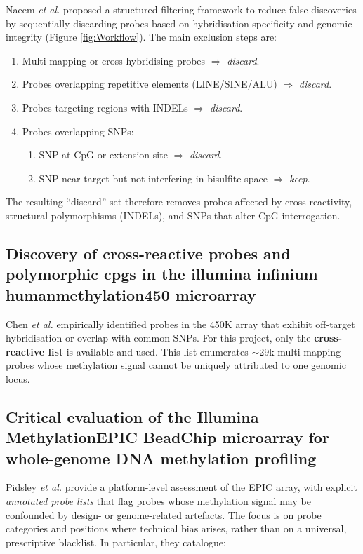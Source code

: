 \documentclass[10pt]{extarticle}
\begin{document}
Naeem \emph{et al.} \cite{naeem2014} proposed a structured filtering framework to reduce false discoveries by sequentially discarding probes based on hybridisation specificity and genomic integrity (Figure \ref{fig:Workflow}).  
The main exclusion steps are:
\begin{enumerate}[label=-]
  \item Multi-mapping or cross-hybridising probes $\Rightarrow$ \textit{discard}.
  \item Probes overlapping repetitive elements (LINE/SINE/ALU) $\Rightarrow$ \textit{discard}.
  \item Probes targeting regions with INDELs $\Rightarrow$ \textit{discard}.
  \item Probes overlapping SNPs:
    \begin{enumerate}[label=--]
      \item SNP at CpG or extension site $\Rightarrow$ \textit{discard}.
      \item SNP near target but not interfering in bisulfite space $\Rightarrow$ \textit{keep}.
    \end{enumerate}
\end{enumerate}
The resulting ``discard'' set therefore removes probes affected by cross-reactivity, structural polymorphisms (INDELs), and SNPs that alter CpG interrogation.

\subsection{Discovery of cross-reactive probes and polymorphic cpgs in the illumina infinium humanmethylation450 microarray}
\label{app:chen2013}
Chen \emph{et al.} \cite{chen2013} empirically identified probes in the 450K array that exhibit off-target hybridisation or overlap with common SNPs.  
For this project, only the \textbf{cross-reactive list} is available and used.  
This list enumerates $\sim$29k multi-mapping probes whose methylation signal cannot be uniquely attributed to one genomic locus.

\subsection{Critical evaluation of the Illumina MethylationEPIC BeadChip microarray for whole-genome DNA methylation profiling}
\label{app:pidsley2016}
Pidsley \emph{et al.} \cite{pidsley2016} provide a platform-level assessment of the EPIC array, with explicit \emph{annotated probe lists} that flag probes whose methylation signal may be confounded by design- or genome-related artefacts. The focus is on probe categories and positions where technical bias arises, rather than on a universal, prescriptive blacklist. In particular, they catalogue:
\end{document}
